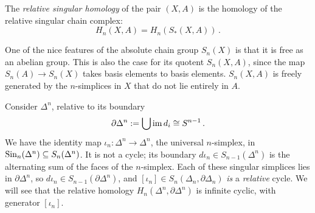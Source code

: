\begin{definition} The {\em relative singular homology} of the pair $(X,A)$
is the homology of the relative singular chain complex:
\[
H_n(X,A)=H_n(S_*(X,A))\,.
\]
\end{definition}

One of the nice features of the absolute chain group $S_n(X)$ is that it is free as an abelian group. This is also the case for its quotent $S_n(X,A)$, since
the map $S_n(A)\to S_n(X)$ takes basis elements to basis elements. 
$S_n(X,A)$ is freely generated by the $n$-simplices in $X$ that do not lie 
entirely in $A$.
\begin{example}
Consider $\Delta^n$, relative to its boundary 
\[
\partial\Delta^n:=\bigcup \operatorname{im} d_i\cong S^{n-1}\,.
\] 
We have the identity map $\iota_n:\Delta^n\to \Delta^n$, the universal $n$-simplex, in $\mathrm{Sin}_n(\Delta^n)\subseteq S_n(\Delta^n)$. It is not a cycle; its boundary $d\iota_n\in S_{n-1}(\Delta^n)$ is the alternating sum of the faces of the $n$-simplex. Each of these singular simplices lies in $\partial\Delta^n$, so $d\iota_n\in S_{n-1}(\partial\Delta^n)$, and 
$[\iota_n]\in S_n(\Delta_n,\partial\Delta_n)$ {\em is} a {\em relative} cycle. 
We will see that the relative homology $H_n(\Delta^n,\partial\Delta^n)$ is infinite cyclic, with generator $[\iota_n]$. 
\end{example}
